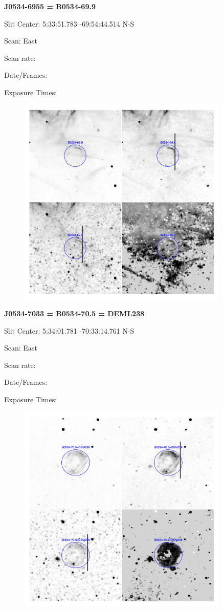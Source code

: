 \documentclass[11pt]{article}
\begin{document}
\newpage
{\bf J0534-6955 = B0534-69.9}  
 
Slit Center:   5:33:51.783  -69:54:44.514  N-S

Scan:  East

Scan rate:  

Date/Frames:

Exposure Times:  

\begin{figure}
\includegraphics[width=10.05cm]{snapshots/B0534-699.png}
\end{figure}

\newpage
{\bf J0534-7033 = B0534-70.5 = DEML238}  
 
Slit Center:   5:34:01.781 -70:33:14.761  N-S

Scan:  East

Scan rate:  

Date/Frames:

Exposure Times:  

\begin{figure}
\includegraphics[width=10.05cm]{snapshots/B0534-705.png}
\end{figure}
\end{document}
